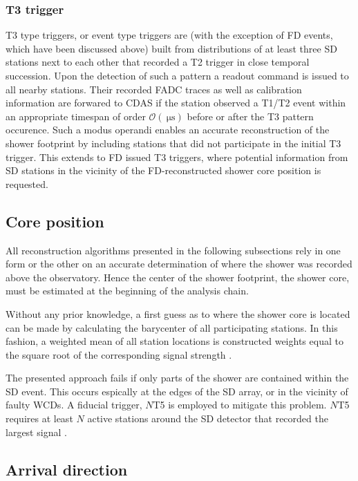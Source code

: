 \subsubsection{T3 trigger}
\label{sssec:t3-trigger}

T3 type triggers, or event type triggers are (with the exception of FD events, which have been discussed above) built from distributions of at least three SD 
stations next to each other that recorded a T2 trigger in close temporal succession. Upon the detection of such a pattern a readout command is issued to all nearby 
stations. Their recorded FADC traces as well as calibration information are forwared to CDAS if the station observed a T1/T2 event within an appropriate timespan 
of order $\mathcal{O}(\SI{}{\micro\second})$ before or after the T3 pattern occurence. Such a modus operandi enables an accurate reconstruction of the shower 
footprint by including stations that did not participate in the initial T3 trigger. This extends to FD issued T3 triggers, where potential information from SD 
stations in the vicinity of the FD-reconstructed shower core position is requested.

\subsection{Core position}
\label{ssec:core-position}

All reconstruction algorithms presented in the following subsections rely in one form or the other on an accurate determination of where the shower was recorded 
above the observatory. Hence the center of the shower footprint, the shower core, must be estimated at the beginning of the analysis chain. 

Without any prior knowledge, a first guess as to where the shower core is located can be made by calculating the barycenter of all participating stations. In this 
fashion, a weighted mean of all station locations is constructed weights equal to the square root of the corresponding signal strength \cite{SDReconstruction}.

The presented approach fails if only parts of the shower are contained within the SD event. This occurs espically at the edges of the SD array, or in the vicinity
of faulty WCDs. A fiducial trigger, $N$T5 is employed to mitigate this problem. $N$T5 requires at least $N$ active stations around the SD detector that recorded 
the largest signal \cite{abraham2010trigger}.

\subsection{Arrival direction}
\label{ssec:arrival-direction}

